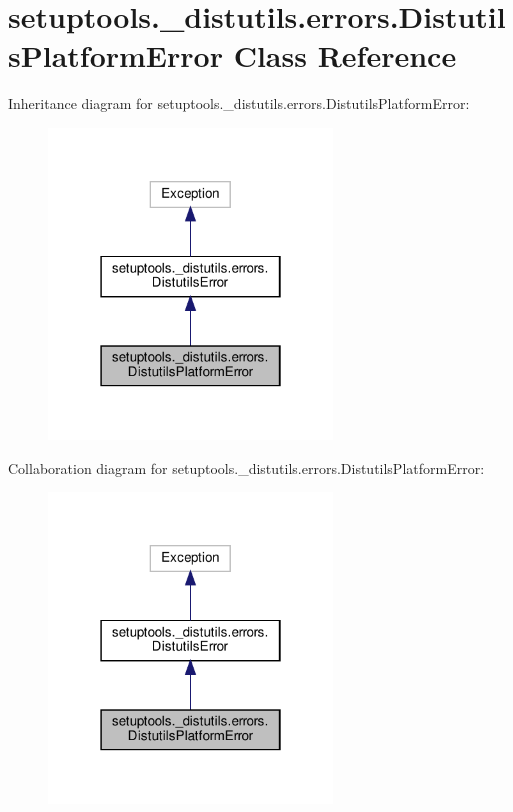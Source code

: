 \hypertarget{classsetuptools_1_1__distutils_1_1errors_1_1DistutilsPlatformError}{}\section{setuptools.\+\_\+distutils.\+errors.\+Distutils\+Platform\+Error Class Reference}
\label{classsetuptools_1_1__distutils_1_1errors_1_1DistutilsPlatformError}


Inheritance diagram for setuptools.\+\_\+distutils.\+errors.\+Distutils\+Platform\+Error\+:
\nopagebreak
\begin{figure}[H]
\begin{center}
\leavevmode
\includegraphics[width=214pt]{classsetuptools_1_1__distutils_1_1errors_1_1DistutilsPlatformError__inherit__graph}
\end{center}
\end{figure}


Collaboration diagram for setuptools.\+\_\+distutils.\+errors.\+Distutils\+Platform\+Error\+:
\nopagebreak
\begin{figure}[H]
\begin{center}
\leavevmode
\includegraphics[width=214pt]{classsetuptools_1_1__distutils_1_1errors_1_1DistutilsPlatformError__coll__graph}
\end{center}
\end{figure}


